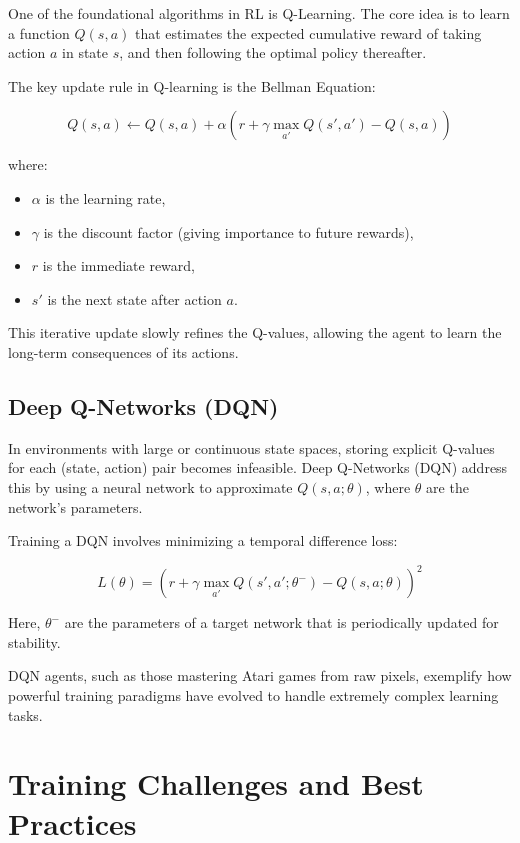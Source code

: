 \documentclass[openany]{book}
\begin{document}
One of the foundational algorithms in RL is Q-Learning. The core idea is to 
learn a function $Q(s,a)$ that estimates the expected cumulative reward of 
taking action $a$ in state $s$, and then following the optimal policy 
thereafter.

The key update rule in Q-learning is the Bellman Equation:

\begin{equation}
Q(s,a) \leftarrow Q(s,a) + \alpha \left( r + 
\gamma \max_{a'} Q(s',a') - Q(s,a) \right)
\end{equation}

where:
\begin{itemize}
    \item $\alpha$ is the learning rate,
    \item $\gamma$ is the discount factor (giving importance to future rewards),
    \item $r$ is the immediate reward,
    \item $s'$ is the next state after action $a$.
\end{itemize}

This iterative update slowly refines the Q-values, allowing the agent to learn 
the long-term consequences of its actions.

\subsection{Deep Q-Networks (DQN)}

In environments with large or continuous state spaces, storing explicit Q-values 
for each (state, action) pair becomes infeasible. Deep Q-Networks (DQN) address 
this by using a neural network to approximate $Q(s, a; \theta)$, where $\theta$ 
are the network's parameters.

Training a DQN involves minimizing a temporal difference loss:

\begin{equation}
L(\theta) = \left( r + \gamma \max_{a'} Q(s', 
a'; \theta^-) - Q(s, a; \theta) \right)^2
\end{equation}

Here, $\theta^-$ are the parameters of a target network that is periodically 
updated for stability.

DQN agents, such as those mastering Atari games from raw pixels, exemplify how 
powerful training paradigms have evolved to handle extremely complex learning 
tasks.

\section{Training Challenges and Best Practices}
\end{document}
